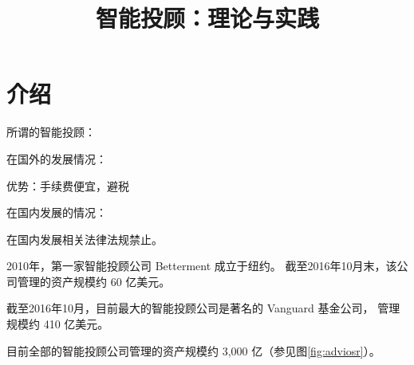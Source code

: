 \documentclass[a4paper, 11pt, UTF8]{report}
\begin{document}
\title{智能投顾：理论与实践}
\maketitle
\newpage
\pagestyle{empty}
\tableofcontents
\newpage

\pagestyle{plain}

\chapter{介绍}

所谓的智能投顾：

在国外的发展情况：

优势：手续费便宜，避税


在国内发展的情况：

在国内发展相关法律法规禁止。

2010年，第一家智能投顾公司 Betterment 成立于纽约。
截至2016年10月末，该公司管理的资产规模约 60 亿美元。

截至2016年10月，目前最大的智能投顾公司是著名的 Vanguard 基金公司，
管理规模约 410 亿美元。

目前全部的智能投顾公司管理的资产规模约 3,000 亿（参见图\ref{fig:adviosr}）。
\end{document}

